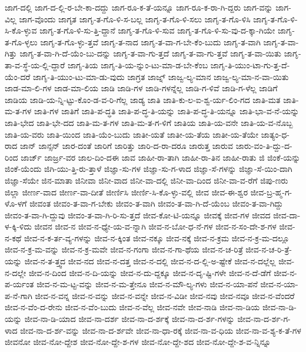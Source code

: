 {ಜಾಗ-ದಲ್ಲಿ
ಜಾಗ-ದ-ಲ್ಲಿ-ರ-ಬೇ-ಕಾ-ದದ್ದು
ಜಾಗ-ರೂ-ಕ-ತೆ-ಯನ್ನೂ
ಜಾಗ-ರೂ-ಕ-ರಾ-ಗಿ-ದ್ದರು
ಜಾಗ-ವನ್ನು
ಜಾಗ-ವಿಲ್ಲ
ಜಾಗ-ವೊಂದು
ಜಾಗೃತ
ಜಾಗೃ-ತ-ಗೊ-ಳಿ-ಸ-ಬಲ್ಲ
ಜಾಗೃ-ತ-ಗೊ-ಳಿ-ಸಲು
ಜಾಗೃ-ತ-ಗೊ-ಳಿಸಿ
ಜಾಗೃ-ತ-ಗೊ-ಳಿ-ಸಿ-ಕೊ-ಳ್ಳುವ
ಜಾಗೃ-ತ-ಗೊ-ಳಿ-ಸು-ತ್ತಿ-ದ್ದಾನೆ
ಜಾಗೃ-ತ-ಗೊ-ಳಿ-ಸುವ
ಜಾಗೃ-ತ-ಗೊ-ಳಿ-ಸು-ವು-ದ-ಕ್ಕಾ-ಗಿಯೇ
ಜಾಗೃ-ತ-ಗೊ-ಳ್ಳಲು
ಜಾಗೃ-ತ-ಗೊ-ಳ್ಳು-ತ್ತವೆ
ಜಾಗೃ-ತ-ನಾದ
ಜಾಗೃ-ತ-ವಾ-ಗ-ಬೇ-ಕೆಂ-ಬುದು
ಜಾಗೃ-ತ-ವಾಗಿ
ಜಾಗೃ-ತ-ವಾ-ಗಿತ್ತು
ಜಾಗೃ-ತ-ವಾ-ಗಿ-ದೆ-ಯೆಂ-ಬು-ದನ್ನು
ಜಾಗೃ-ತ-ವಾ-ಗು-ತ್ತದೆ
ಜಾಗೃ-ತ-ವಾ-ಗು-ತ್ತವೆ
ಜಾಗೃ-ತ-ವಾ-ಯಿತು
ಜಾಗೃ-ತಾ-ವ-ಸ್ಥೆ-ಯ-ಲ್ಲಿ-ದ್ದಾರೆ
ಜಾಗೃ-ತಿಯ
ಜಾಗೃ-ತಿ-ಯ-ನ್ನುಂ-ಟು-ಮಾ-ಡ-ಬೇ-ಕೆಂಬ
ಜಾಗೃ-ತಿ-ಯುಂ-ಟಾ-ಗು-ತ್ತ-ದೆ-ಯೆಂ-ದರೆ
ಜಾಗೃ-ತಿ-ಯುಂ-ಟು-ಮಾ-ಡು-ವುದು
ಜಾಗ್ರತ
ಜಾಜ್ನ್
ಜಾಜ್ವ-ಲ್ಯ-ಮಾನ
ಜಾಜ್ವ-ಲ್ಯ-ಮಾ-ನ-ವಾ-ಯಿತು
ಜಾಡ-ಮಾ-ಲಿ-ಗಳ
ಜಾಡ-ಮಾ-ಲಿಯ
ಜಾಡಿ
ಜಾಡಿ-ಗಳ
ಜಾಡಿ-ಗಳನ್ನೆಲ್ಲ
ಜಾಡಿ-ಗ-ಳಿವೆ
ಜಾಡಿ-ಗ-ಳೆಲ್ಲ
ಜಾಡಿಗೆ
ಜಾಡಿಯ
ಜಾಡಿ-ಯ-ನ್ನಿ-ಟ್ಟು-ಕೊಂ-ಡ-ವ-ರಿ-ಗೆಲ್ಲ
ಜಾಡ್ಯ
ಜಾತಿ
ಜಾತಿ-ಕು-ಲ-ಐ-ಶ್ವ-ರ್ಯ-ಲಿಂ-ಗದ
ಜಾತಿ-ಮತ
ಜಾತಿ-ಮ-ತ-ಗಳ
ಜಾತಿ-ಗಳ
ಜಾತಿಗೆ
ಜಾತಿ-ಪ-ದ್ಧತಿ
ಜಾತಿ-ಪ-ದ್ಧ-ತಿ-ಯನ್ನು
ಜಾತಿ-ಪ-ದ್ಧ-ತಿ-ಯನ್ನೂ
ಜಾತಿ-ಭಾ-ವ-ನೆ-ಯನ್ನು
ಜಾತಿ-ಭೇದ
ಜಾತಿ-ಭೇ-ದದ
ಜಾತಿ-ಮ-ತ-ಗಳ
ಜಾತಿ-ಮ-ತ-ಗ-ಳಿಗೆ
ಜಾತಿಯ
ಜಾತಿ-ಯ-ವನೇ
ಜಾತಿ-ಯ-ವ-ನೊಬ್ಬ
ಜಾತಿ-ಯ-ವರು
ಜಾತಿ-ಯಿಂದ
ಜಾತಿ-ಯೆಂ-ಬುದು
ಜಾತೀ-ಯತೆ
ಜಾತೀ-ಯ-ತೆಯ
ಜಾತೀ-ಯ-ತೆಯೇ
ಜಾತ್ಯಂ-ಧ-ರಾದ
ಜಾನ್
ಜಾನ್ಸನ್
ಜಾರ-ದಂತೆ
ಜಾರಿಗೆ
ಜಾರಿತ್ತು
ಜಾರಿ-ದ-ರಾ-ದರೂ
ಜಾರುತ್ತ
ಜಾರುವ
ಜಾರು-ವಂ-ತಿ-ದ್ದು-ದ-ರಿಂದ
ಜಾರ್ಜ್
ಜಾರ್ಜ್ರ-ವರ
ಜಾಲ-ದಿಂ-ದಈ
ಜಾವ
ಜಾಹೀ-ರಾ-ತಾಗಿ
ಜಾಹೀ-ರಾ-ತಿನ
ಜಾಹೀ-ರಾತು
ಜಿ
ಜಿಂಕೆ-ಯನ್ನು
ಜಿಂಕೆ-ಯೆಂದು
ಜಿಗಿ-ಯು-ತ್ತಿ-ರು-ತ್ತಾಳೆ
ಜಿಜ್ಞಾ-ಸು-ಗಳ
ಜಿಜ್ಞಾ-ಸು-ಗ-ಳಾದ
ಜಿಜ್ಞಾ-ಸೆ-ಗಳನ್ನು
ಜಿಜ್ಞಾ-ಸೆ-ಯಿಂ-ದಾಗಿ
ಜಿಜ್ಞಾ-ಸೆಯೇ
ಜಿನ-ಮಾತಾ
ಜಿನೀವಾ
ಜಿನೀ-ವಾದ
ಜಿನೀ-ವಾ-ದಲ್ಲಿ
ಜಿನೀ-ವಾ-ದಿಂದ
ಜಿನೀ-ವಾ-ವ-ರೆಗೆ
ಜಿಪು-ಣರು
ಜಿಲ್ಲಾ
ಜೀರ್ಣ-ವಾದ
ಜೀರ್ಣ-ವಾ-ದೀತೆ
ಜೀರ್ಣಿಸಿ
ಜೀರ್ಣಿ-ಸಿ-ಕೊ-ಳ್ಳು-ವಲ್ಲಿ
ಜೀವ
ಜೀವ-ಈ-ಶ್ವರ
ಜೀವ-ಬ್ರ-ಹ್ಮ-ಗ-ಳೊ-ಳಗೆ
ಜೀವಂತ
ಜೀವಂ-ತ-ವಾ-ಗ-ಬೇಕು
ಜೀವಂ-ತ-ವಾಗಿ
ಜೀವಂ-ತ-ವಾ-ಗಿ-ದೆ-ಯೆಂಬ
ಜೀವಂ-ತ-ವಾ-ಗಿದ್ದು
ಜೀವಂ-ತ-ವಾ-ಗಿ-ದ್ದುವು
ಜೀವಂ-ತ-ವಾ-ಗಿ-ರಿ-ಸು-ತ್ತದೆ
ಜೀವ-ಕೋ-ಟಿ-ಯನ್ನೂ
ಜೀವಕ್ಕೆ
ಜೀವ-ಗಳ
ಜೀವದ
ಜೀವ-ದಾ-ಳ-ಕ್ಕಿ-ಳಿದು
ಜೀವನ
ಜೀವ-ನ
ಜೀವ-ನ-ಧ್ಯೇ-ಯ-ವ-ನ್ನಾಗಿ
ಜೀವ-ನ-ಬೋ-ಧ-ನೆ-ಗಳ
ಜೀವ-ನ-ಸಂ-ದೇ-ಶ-ಗಳ
ಜೀವ-ನ-ಕಥೆ
ಜೀವ-ನ-ಕ-ರ್ತ-ವ್ಯ-ಗಳನ್ನು
ಜೀವ-ನ-ಕ್ಕಿಂತ
ಜೀವ-ನಕ್ಕೂ
ಜೀವ-ನಕ್ಕೆ
ಜೀವ-ನ-ಕ್ರಮ
ಜೀವ-ನ-ಕ್ರ-ಮ-ದಲ್ಲೂ
ಜೀವ-ನ-ಕ್ರ-ಮ-ವನ್ನು
ಜೀವ-ನ-ಕ್ರ-ಮವೇ
ಜೀವ-ನ-ಗಂಗಾ
ಜೀವ-ನ-ಗಾ-ಥೆಯ
ಜೀವ-ನ-ಚ-ರಿತ್ರೆ
ಜೀವ-ನ-ಚ-ರಿ-ತ್ರೆ-ಯನ್ನು
ಜೀವ-ನ-ತ-ತ್ತ್ವದ
ಜೀವ-ನದ
ಜೀವ-ನ-ದತ್ತ
ಜೀವ-ನ-ದಲ್ಲಿ
ಜೀವ-ನ-ದ-ಲ್ಲಿ-ಅ-ಷ್ಟೇಕೆ
ಜೀವ-ನ-ದಲ್ಲೆಲ್ಲ
ಜೀವ-ನ-ದಲ್ಲೇ
ಜೀವ-ನ-ದಿಂದ
ಜೀವ-ನ-ದಿ-ಯನ್ನು
ಜೀವ-ನ-ದು-ದ್ದಕ್ಕೂ
ಜೀವ-ನ-ದೃ-ಷ್ಟಿ-ಗಳೇ
ಜೀವ-ನ-ದೆ-ಡೆಗೆ
ಜೀವ-ನ-ಪ-ರ್ಯಂತ
ಜೀವ-ನ-ಮ-ಟ್ಟ-ವನ್ನು
ಜೀವ-ನ-ಮ-ತ್ತೇನೂ
ಜೀವ-ನ-ಮೌ-ಲ್ಯ-ಗಳು
ಜೀವ-ನ-ಯಾ-ಪನೆ
ಜೀವ-ನ-ಯಾ-ಪ-ನೆ-ಗಾಗಿ
ಜೀವ-ನ-ವನ್ನ
ಜೀವ-ನ-ವನ್ನು
ಜೀವ-ನ-ವನ್ನೇ
ಜೀವ-ನ-ವಿಡೀ
ಜೀವ-ನವು
ಜೀವ-ನವೂ
ಜೀವ-ನ-ವೆಂದರೆ
ಜೀವ-ನ-ವೆಂ-ದ-ರೇನು
ಜೀವ-ನ-ವೆಂ-ಬುದು
ಜೀವ-ನ-ವೆಲ್ಲ
ಜೀವ-ನವೇ
ಜೀವ-ನಾಡಿ
ಜೀವ-ನಾ-ಡಿಯ
ಜೀವ-ನಾ-ಡಿ-ಯನ್ನು
ಜೀವ-ನಾ-ಡಿ-ಯಾದ
ಜೀವ-ನಾ-ದರ್ಶ
ಜೀವ-ನಾ-ದ-ರ್ಶಕ್ಕೆ
ಜೀವ-ನಾ-ದ-ರ್ಶ-ಗಳನ್ನು
ಜೀವ-ನಾ-ದ-ರ್ಶ-ಗ-ಳಾದ
ಜೀವ-ನಾ-ದ-ರ್ಶ-ವನ್ನು
ಜೀವ-ನಾ-ದ-ರ್ಶವೇ
ಜೀವ-ನಾ-ಧಾ-ರಕ್ಕೆ
ಜೀವ-ನಾ-ವ-ಧಿಯ
ಜೀವ-ನಾ-ವ-ಶ್ಯ-ಕ-ತೆ-ಗಳ
ಜೀವನೋ
ಜೀವ-ನೋ-ದ್ದೇಶ
ಜೀವ-ನೋ-ದ್ದೇ-ಶ-ಗಳ
ಜೀವ-ನೋ-ದ್ದೇ-ಶದ
ಜೀವ-ನೋ-ದ್ದೇ-ಶ-ವ-ನ್ನಿನ್ನೂ
}
